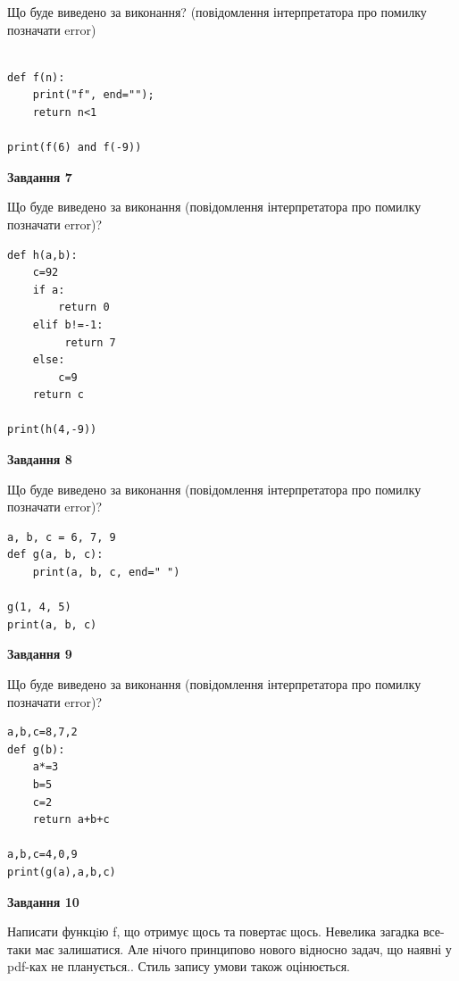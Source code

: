 \documentclass[12pt, ukrainian]{article}
\begin{document}
{\begin {large}
Що буде виведено за виконання? (повідомлення інтерпретатора про помилку позначати error)\par
\begin{verbatim}

def f(n):
    print("f", end="");
    return n<1

print(f(6) and f(-9))
\end{verbatim}

{\begin {center}\textbf{Завдання 7}\end {center}}

Що буде виведено за виконання (повідомлення інтерпретатора про помилку позначати error)?\par
\begin{verbatim}
def h(a,b):
    c=92
    if a:
        return 0
    elif b!=-1:
         return 7
    else: 
        c=9
    return c

print(h(4,-9))
\end{verbatim}

{\begin {center}\textbf{Завдання 8}\end {center}}

Що буде виведено за виконання (повідомлення інтерпретатора про помилку позначати error)?\par
\begin{verbatim}
a, b, c = 6, 7, 9
def g(a, b, c):
    print(a, b, c, end=" ")

g(1, 4, 5)
print(a, b, c)
\end{verbatim}

{\begin {center}\textbf{Завдання 9}\end {center}}

Що буде виведено за виконання (повідомлення інтерпретатора про помилку позначати error)?\par
\begin{verbatim}
a,b,c=8,7,2
def g(b):
    a*=3
    b=5
    c=2
    return a+b+c

a,b,c=4,0,9
print(g(a),a,b,c)
\end{verbatim}

{\begin {center}\textbf{Завдання 10}\end {center}}


Написати функцiю f, що отримує щось та повертає щось. Невелика загадка все-таки має залишатися. Але нічого принципово нового відносно задач, що наявні у pdf-ках не планується.. Стиль запису умови також оцінюється.\par
\end {large}}
\newpage
\end{document}
